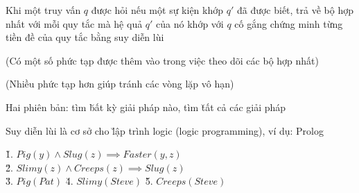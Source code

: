 \documentclass[fleqn]{article}
\begin{document}
\begin{huge}

Khi một truy vấn $q$ được hỏi\al
   nếu một sự kiện khớp $q'$ đã được biết, trả về bộ hợp nhất\al
   với mỗi quy tắc mà hệ quả $q'$ của nó khớp với $q$\nl
      cố gắng chứng minh từng tiền đề của quy tắc bằng suy diễn lùi

(Có một số phức tạp được thêm vào trong việc theo dõi các bộ hợp nhất)

(Nhiều phức tạp hơn giúp tránh các vòng lặp vô hạn)

Hai phiên bản: tìm \u{bất kỳ} giải pháp nào, tìm \u{tất cả} các giải pháp

Suy diễn lùi là cơ sở cho \u{lập trình logic (logic programming)}, ví dụ: Prolog



\u{1.} $Pig(y) \land Slug(z) \implies Faster(y,z)$\\
\u{2.} $Slimy(z) \land Creeps(z) \implies Slug(z)$\\
\u{3.} $Pig(Pat)$ \qquad \u{4.} $Slimy(Steve)$ \qquad \u{5.} $Creeps(Steve)$

\vspace*{0.4in}

\textwidth
{}




\end{huge} 
\end{document}

